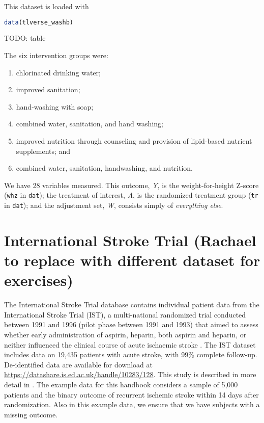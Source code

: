 \documentclass[
  12pt, krantz2,
]{krantz}
\newcommand{\passthrough}[1]{#1}
\providecommand{\tightlist}{%
  \setlength{\itemsep}{0pt}\setlength{\parskip}{0pt}}
\theoremstyle{definition}
\theoremstyle{definition}
\theoremstyle{definition}
\newcommand{\1}{\mathbbm{1}}
\begin{document}
This dataset is loaded with

\begin{lstlisting}[language=R]
data(tlverse_washb)
\end{lstlisting}

TODO: table

The six intervention groups were:

\begin{enumerate}
\def\labelenumi{\arabic{enumi}.}
\tightlist
\item
  chlorinated drinking water;
\item
  improved sanitation;
\item
  hand-washing with soap;
\item
  combined water, sanitation, and hand washing;
\item
  improved nutrition through counseling and provision of lipid-based nutrient supplements; and
\item
  combined water, sanitation, handwashing, and nutrition.
\end{enumerate}

We have 28 variables measured. This outcome, \emph{Y}, is the weight-for-height Z-score (\passthrough{\lstinline!whz!} in \passthrough{\lstinline!dat!}); the treatment of interest, \emph{A}, is the randomized treatment group (\passthrough{\lstinline!tr!} in \passthrough{\lstinline!dat!}); and the adjustment set, \emph{W}, consists simply of \emph{everything else}.

\hypertarget{international-stroke-trial-rachael-to-replace-with-different-dataset-for-exercises}{%
\section{International Stroke Trial (Rachael to replace with different dataset for exercises)}\label{international-stroke-trial-rachael-to-replace-with-different-dataset-for-exercises}}

The International Stroke Trial database contains individual patient data from the International Stroke Trial (IST), a multi-national randomized trial conducted between 1991 and 1996 (pilot phase between 1991 and 1993) that aimed to assess whether early administration of aspirin, heparin, both aspirin and heparin, or neither influenced the clinical course of acute ischaemic stroke \citep{sandercock1997international}. The IST dataset includes data on 19,435 patients with acute stroke, with 99\% complete follow-up. De-identified data are available for download at \url{https://datashare.is.ed.ac.uk/handle/10283/128}. This study is described in more detail in \citet{sandercock2011international}. The example data for this handbook considers a sample of 5,000 patients and the binary outcome of recurrent ischemic stroke within 14 days after randomization. Also in this example data, we ensure that we have subjects with a missing outcome.
\end{document}
